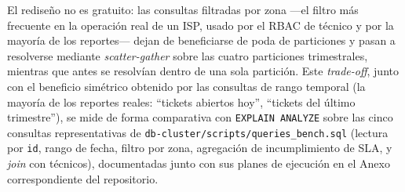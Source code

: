 El rediseño no es gratuito: las consultas filtradas por zona —el filtro más frecuente en la
operación real de un ISP, usado por el RBAC de técnico y por la mayoría de los reportes— dejan de
beneficiarse de poda de particiones y pasan a resolverse mediante \emph{scatter-gather} sobre las
cuatro particiones trimestrales, mientras que antes se resolvían dentro de una sola partición. Este
\emph{trade-off}, junto con el beneficio simétrico obtenido por las consultas de rango temporal
(la mayoría de los reportes reales: ``tickets abiertos hoy'', ``tickets del último trimestre''), se
mide de forma comparativa con \texttt{EXPLAIN ANALYZE} sobre las cinco consultas representativas de
\texttt{db-cluster/scripts/queries\_bench.sql} (lectura por \texttt{id}, rango de fecha, filtro por
zona, agregación de incumplimiento de SLA, y \emph{join} con técnicos), documentadas junto con sus
planes de ejecución en el Anexo correspondiente del repositorio.

